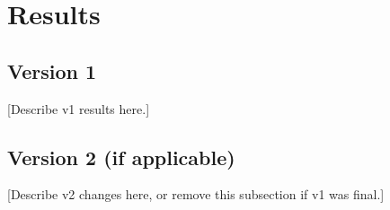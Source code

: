 \section{Results}

\subsection{Version 1}


[Describe v1 results here.]


\subsection{Version 2 (if applicable)}


[Describe v2 changes here, or remove this subsection if v1 was final.]

